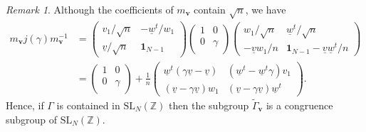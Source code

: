 \documentclass[a4paper,11pt]{amsart} %
\newcommand{\8}{\infty}
\newcommand{\Z}{\mathbb{Z}}
\newcommand{\id}{\mathbf{1}}
\newcommand{\wud}{\underline{w}}
\newcommand{\vud}{\underline{v}}
\newcommand{\vbf}{\mathbf{v}}
\newcommand{\SL}{\mathrm{SL}}
\newcommand{\Gamtil}{\widetilde{\Gamma}}
\theoremstyle{mytheoremstyle}
\theoremstyle{remark}
\newtheorem{rmk}{Remark}[section]
\numberwithin{equation}{section}
\begin{document}
\begin{rmk}
    Although the coefficients of $m_\vbf$ contain $\sqrt{n}$, we have
    \begin{align} \label{conjugation}
m_\vbf j(\gamma) m_\vbf^{-1} &= \begin{pmatrix} v_1/\sqrt{n} & -\wud^t/w_1 \\
    \vud/\sqrt{n} & \id_{N-1}
    \end{pmatrix} \begin{pmatrix}
        1 & 0 \\
        0 & \gamma \\
    \end{pmatrix} \begin{pmatrix} w_1/\sqrt{n} & \wud^t/\sqrt{n} \\
    -\vud w_1/n & \id_{N-1}-\vud \wud^t/n
    \end{pmatrix} \nonumber \\
& =\begin{pmatrix}
        1 & 0 \\
        0 & \gamma \\
    \end{pmatrix}+\frac{1}{n} \begin{pmatrix}
    \wud^t(\gamma\vud-\vud) & (\wud^t-\wud^t\gamma)v_1 \\
    (\vud-\gamma\vud)w_1 & (\vud-\gamma \vud)\wud^t
\end{pmatrix}.
\end{align}
Hence, if $\Gamma$ is contained in $\SL_N(\Z)$ then the subgroup $\Gamtil_\vbf$ is a congruence subgroup of $\SL_N(\Z)$.
\end{rmk}
\end{document}
